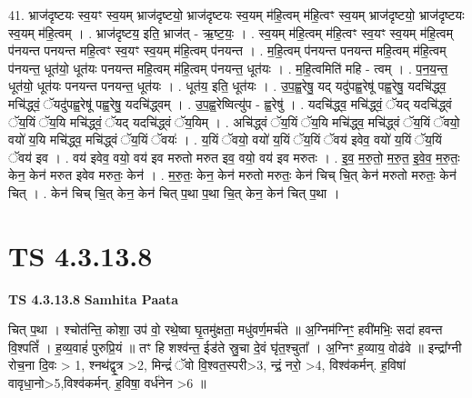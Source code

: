\documentclass[17pt]{extarticle}
\begin{document}
41. भ्राज॑दृष्टयः स्व॒यꣳ स्व॒यम् भ्राज॑दृष्टयो॒ भ्राज॑दृष्टयः स्व॒यम् म॑हि॒त्वम् म॑हि॒त्वꣳ स्व॒यम् भ्राज॑दृष्टयो॒ भ्राज॑दृष्टयः स्व॒यम् म॑हि॒त्वम् । . भ्राज॑दृष्टय॒ इति॒ भ्राज॑त् - ऋ॒ष्ट॒यः॒ । . स्व॒यम् म॑हि॒त्वम् म॑हि॒त्वꣳ स्व॒यꣳ स्व॒यम् म॑हि॒त्वम् प॑नयन्त पनयन्त महि॒त्वꣳ स्व॒यꣳ स्व॒यम् म॑हि॒त्वम् प॑नयन्त । . म॒हि॒त्वम् प॑नयन्त पनयन्त महि॒त्वम् म॑हि॒त्वम् प॑नयन्त॒ धूत॑यो॒ धूत॑यः पनयन्त महि॒त्वम् म॑हि॒त्वम् प॑नयन्त॒ धूत॑यः । . म॒हि॒त्वमिति॑ महि - त्वम् । . प॒न॒य॒न्त॒ धूत॑यो॒ धूत॑यः पनयन्त पनयन्त॒ धूत॑यः । . धूत॑य॒ इति॒ धूत॑यः । . उ॒प॒ह्व॒रेषु॒ यद् यदु॑पह्व॒रेषू॑ पह्व॒रेषु॒ यदचि॑द्ध्व॒ मचि॑द्ध्वं॒ ॅयदु॑पह्व॒रेषू॑ पह्व॒रेषु॒ यदचि॑द्ध्वम् । . उ॒प॒ह्व॒रेष्वित्यु॑प - ह्व॒रेषु॑ । . यदचि॑द्ध्व॒ मचि॑द्ध्वं॒ ॅयद् यदचि॑द्ध्वं ॅय॒यिं ॅय॒यि मचि॑द्ध्वं॒ ॅयद् यदचि॑द्ध्वं ॅय॒यिम् । . अचि॑द्ध्वं ॅय॒यिं ॅय॒यि मचि॑द्ध्व॒ मचि॑द्ध्वं ॅय॒यिं ॅवयो॒ वयो॑ य॒यि मचि॑द्ध्व॒ मचि॑द्ध्वं ॅय॒यिं ॅवयः॑ । . य॒यिं ॅवयो॒ वयो॑ य॒यिं ॅय॒यिं ॅवय॑ इवेव॒ वयो॑ य॒यिं ॅय॒यिं ॅवय॑ इव । . वय॑ इवेव॒ वयो॒ वय॑ इव मरुतो मरुत इव॒ वयो॒ वय॑ इव मरुतः । . इ॒व॒ म॒रु॒तो॒ म॒रु॒त॒ इ॒वे॒व॒ म॒रु॒तः॒ केन॒ केन॑ मरुत इवेव मरुतः॒ केन॑ । . म॒रु॒तः॒ केन॒ केन॑ मरुतो मरुतः॒ केन॑ चिच् चि॒त् केन॑ मरुतो मरुतः॒ केन॑ चित् । . केन॑ चिच् चि॒त् केन॒ केन॑ चित् प॒था प॒था चि॒त् केन॒ केन॑ चित् प॒था । \newline
\pagebreak
{}

\section{ TS 4.3.13.8 }

\textbf{TS 4.3.13.8 } \newline
\textbf{Samhita Paata} \newline

चित् प॒था । श्चोत॑न्ति॒ कोशा॒ उप॑ वो॒ रथे॒ष्वा घृ॒तमु॑क्षता॒ मधु॑वर्ण॒मर्च॑ते ॥ अ॒ग्निम॑ग्निꣳ॒॒ हवी॑मभिः॒ सदा॑ हवन्त वि॒श्पतिं᳚ । ह॒व्य॒वाहं॑ पुरुप्रि॒यं ॥ तꣳ हि शश्व॑न्त॒ ईड॑ते स्रु॒चा दे॒वं घृ॑त॒श्चुता᳚ । अ॒ग्निꣳ ह॒व्याय॒ वोढ॑वे ॥ इन्द्रा᳚ग्नी रोच॒ना दि॒वः > 1, श्नथ॑द्वृ॒त्र >2, मिन्द्रं॑ ॅवो वि॒श्वत॒स्परी>3, न्द्रं॒ नरो॒ >4, विश्व॑कर्मन्. ह॒विषा॑ वावृधा॒नो>5,विश्व॑कर्मन्. ह॒विषा॒ वर्ध॑नेन >6 ॥ \newline
\end{document}
